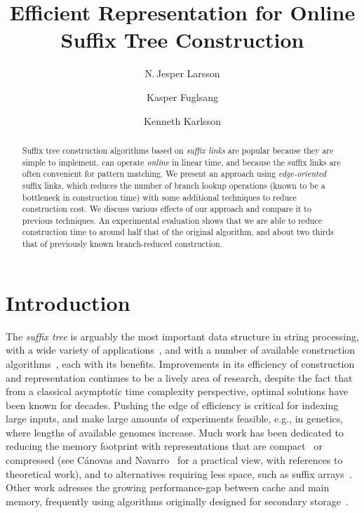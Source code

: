 \documentclass{llncs}
\title{Efficient Representation for \penalty-1 Online Suffix Tree Construction}
\author{N.\,Jesper Larsson \and Kasper Fuglsang \and Kenneth Karlsson}
\institute{IT University of Copenhagen, Denmark,\\
\email{\{jesl,kfug,kkar\}@itu.dk}}
\begin{document}
\maketitle

\begin{abstract}
Suffix tree construction algorithms based on \emph{suffix links} are popular because
  they are simple to implement, can operate \emph{online} in linear time, and because the suffix links are
  often convenient for pattern matching. We present an approach using
  \emph{edge-oriented} suffix links, which reduces the number of branch
  lookup operations (known to be a bottleneck in construction time) with some
  additional techniques to reduce construction cost. We discuss various effects of our approach and
  compare it to previous techniques.  An experimental evaluation shows that we
  are able to reduce construction time to around half that of the original algorithm, and
  about two thirds that of previously known branch-reduced construction.
\end{abstract}


\section{Introduction}\label{sec-intro}


The \emph{suffix tree} is arguably the most important data structure in string
processing, with a wide variety of
applications~\cite{Apostolico85,gusfield,SufComp}, and with a number of
available construction
algorithms~\cite{Weiner73,McR,UkkoOnli,FarFOCS,giegkurtzstoyetopdown,canovas2010practical},
each with its benefits. Improvements in its efficiency of construction and
representation continues to be a lively area of research, despite the fact that
from a classical asymptotic time complexity perspective, optimal solutions have
been known for decades. Pushing the edge of efficiency is critical for indexing
large inputs, and make large amounts of experiments feasible, e.g., in
genetics, where lengths of available genomes increase. Much work has been
dedicated to reducing the memory footprint with representations that are
compact~\cite{kurtzsuftree} or compressed (see C{\'a}novas and
Navarro~\cite{canovas2010practical} for a practical view, with references to
theoretical work), and to alternatives requiring less space, such as suffix
arrays~\cite{Manber93}.  Other work adresses the growing performance-gap
between cache and main memory, frequently using algorithms originally designed
for secondary
storage~\cite{ClarkMunro,ferraginaHierarchxs,TsirogiannisModernSuffix,TianSuffixVLDB}.
\end{document}
